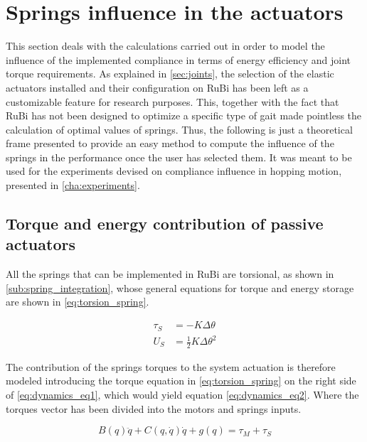 
\section{Springs influence in the actuators}
\label{sec_springs}
This section deals with the calculations carried out in order to model the influence of the implemented compliance in terms of energy efficiency and joint torque requirements.
As explained in \ref{sec:joints}, the selection of the elastic actuators installed and their configuration on RuBi has been left as a customizable feature for research purposes.
This, together with the fact that RuBi has not been designed to optimize a specific type of gait made pointless the calculation of optimal values of springs.
Thus, the following is just a theoretical frame presented to provide an easy method to compute the influence of the springs in the performance once the user has selected them.
It was meant to be used for the experiments devised on compliance influence in hopping motion, presented in \ref{cha:experiments}.

\subsection{Torque and energy contribution of passive actuators} %
\label{sub:torque_contribution_of_passive_actuators}
All the springs that can be implemented in RuBi are torsional, as shown in \ref{sub:spring_integration}, whose general equations for torque and energy storage are shown in \ref{eq:torsion_spring}. 

\begin{equation}
\label{eq:torsion_spring}
\begin{aligned}
	\tau_{S} &= -K \Delta \theta \\
	U_{S} &= \frac{1}{2}K \Delta \theta^2
\end{aligned}
\end{equation}

The contribution of the springs torques to the system actuation is therefore modeled introducing the torque equation in \ref{eq:torsion_spring} on the right side of \ref{eq:dynamics_eq1}, which would yield equation \ref{eq:dynamics_eq2}.
Where the torques vector has been divided into the motors and springs inputs.

\begin{equation}
	\label{eq:dynamics_eq2}
	B(q)\ddot{q} + C(q,\dot{q})\dot{q} + g(q) = \tau_{M} + \tau_{S}
\end{equation}

